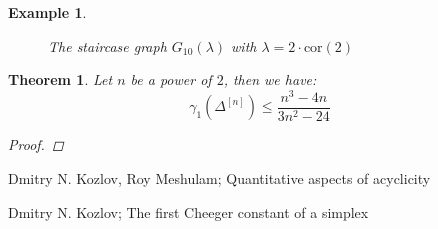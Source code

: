 \documentclass{article}
\newtheorem{thm}{Theorem}[section]
\newtheorem{expl}{Example}[section]
\begin{document}
\begin{expl}
\begin{figure}[ht]
  \caption{The staircase graph $G_{10}(\lambda)$ with $\lambda=2\cdot\text{cor}(2)$}
  \label{figure1:Figure 1}
\end{figure}
\end{expl}

\begin{thm}\label{theorem4}
Let $n$ be a power of $2$, then we have:
\[
\gamma_1(\Delta^{[n]})\leq\frac{n^3-4n}{3n^2-24}
\]
\begin{proof}

\end{proof}
\end{thm}

\begin{thebibliography}{9}

 Dmitry N. Kozlov, Roy Meshulam; Quantitative aspects of acyclicity

 Dmitry N. Kozlov; The first Cheeger constant of a simplex

\end{thebibliography}
\end{document}
